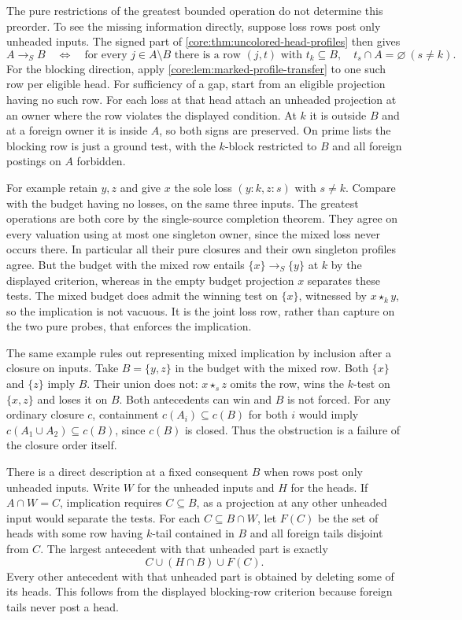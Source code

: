 The pure restrictions of the greatest bounded
operation do not determine this preorder. To see
the missing information directly, suppose loss
rows post only unheaded inputs. The signed part of
\cref{core:thm:uncolored-head-profiles} then gives
\[
 A\longrightarrow_S B \quad\Longleftrightarrow\quad
 \text{for every }j\in A\setminus B\text{ there is a row }(j,t)
 \text{ with }t_k\subseteq B,\quad
 t_s\cap A=\varnothing\ (s\ne k).
\]
For the blocking direction, apply \cref{core:lem:marked-profile-transfer} to one such row per eligible head.
For sufficiency of a gap, start from an eligible
projection having no such row. For each loss at
that head attach an unheaded projection at an
owner where the row violates the displayed
condition. At $k$ it is outside $B$ and at a foreign
owner it is inside $A$, so both signs are preserved.
On prime lists the blocking row is just a ground
test, with the $k$-block restricted to $B$ and all
foreign postings on $A$ forbidden.

For example retain $y,z$ and give $x$ the sole loss
$(y{:}k,z{:}s)$ with $s\ne k$. Compare with the
budget having no losses, on the same three inputs.
The greatest operations are both core by the
single-source completion theorem. They agree on
every valuation using at most one singleton
owner, since the mixed loss never occurs there.
In particular all their pure closures and their own
singleton profiles agree. But the budget with the
mixed row entails $\{x\}\longrightarrow_S\{y\}$
at $k$ by the displayed criterion, whereas in the
empty budget projection $x$ separates these tests.
The mixed budget does admit the winning test on
$\{x\}$, witnessed by $x\star_k y$, so the
implication is not vacuous. It is the joint loss
row, rather than capture on the two pure probes,
that enforces the implication.

The same example rules out representing mixed
implication by inclusion after a closure on inputs.
Take $B=\{y,z\}$ in the budget with the mixed row.
Both $\{x\}$ and $\{z\}$ imply $B$. Their union
does not: $x\star_s z$ omits the row, wins the
$k$-test on $\{x,z\}$ and loses it on $B$.
Both antecedents can win and $B$ is not forced.
For any ordinary closure $c$, containment
$c(A_i)\subseteq c(B)$ for both $i$ would imply
$c(A_1\cup A_2)\subseteq c(B)$, since $c(B)$ is
closed. Thus the obstruction is a failure of the
closure order itself.

There is a direct description at a fixed consequent
$B$ when rows post only unheaded inputs. Write $W$
for the unheaded inputs and $H$ for the heads. If
$A\cap W=C$, implication requires $C\subseteq B$,
as a projection at any other unheaded input would
separate the tests. For each $C\subseteq B\cap W$,
let $F(C)$ be the set of heads with some row
having $k$-tail contained in $B$ and all foreign
tails disjoint from $C$. The largest antecedent
with that unheaded part is exactly
\[
                     C\cup(H\cap B)\cup F(C).
\]
Every other antecedent with that unheaded part
is obtained by deleting some of its heads.
This follows from the displayed blocking-row
criterion because foreign tails never post a head.

